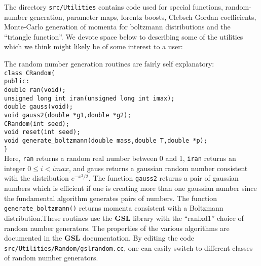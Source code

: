 \documentclass[10pt]{article}
\def\tab{\hspace*{9pt}}
\begin{document}
The directory {\tt src/Utilities} contains code used for special functions, random-number generation, parameter maps, lorentz boosts, Clebsch Gordan coefficients, Monte-Carlo generation of momenta for boltzmann distributions and the ``triangle function''. We devote space below to describing some of the utilities which we think might likely be of some interest to a user:

The random number generation routines are fairly self explanatory:\\
{\tt class CRandom\{\\
 public:\\
\tab double ran(void);\\
\tab unsigned long int iran(unsigned long int imax); \\
\tab double gauss(void);\\
\tab void gauss2(double *g1,double *g2);\\
\tab CRandom(int seed);\\
\tab void reset(int seed);\\
\tab void generate\_boltzmann(double mass,double T,double *p);\\
\}}\\
Here, {\tt ran} returns a random real number between 0 and 1, {\tt iran} returns an integer $0\le i <imax$, and gauss returns a gaussian random number consistent with the distribution $e^{-x^2/2}$. The function {\tt gauss2} returns a pair of gaussian numbers which is efficient if one is creating more than one gaussian number since the fundamental algorithm generates pairs of numbers. The function {\tt generate\_boltzmann()} returns momenta consistent with a Boltzmann distribution.These routines use the {\bf GSL} library with the ``ranlxd1'' choice of random number generators. The properties of the various algorithms are documented in the {\bf GSL} documentation. By editing the code {\tt src/Utilities/Random/gslrandom.cc}, one can easily switch to different classes of random number generators.
\end{document}
